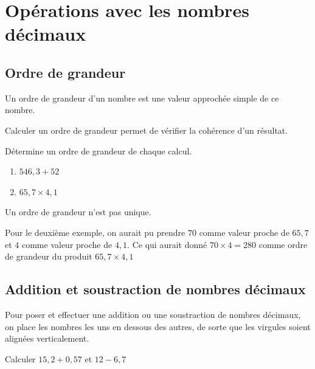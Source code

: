 \documentclass[a4paper,10pt]{report}
\begin{document}
\setcounter{chapter}{9}
\chapter{Opérations avec les nombres décimaux}

\section{Ordre de grandeur}

\begin{defn}
Un ordre de grandeur d’un nombre est une valeur approchée simple de ce nombre.
\end{defn}

\begin{rem}
Calculer un ordre de grandeur permet de vérifier la cohérence d’un résultat.
\end{rem}

\begin{ex}
Détermine un ordre de grandeur de chaque calcul.
\begin{enumerate}
\item $546,3+52$
\item $65,7 \times 4,1$
\end{enumerate}

\noindent\grandscarreaux{\linewidth}{4cm}
\end{ex}

\begin{rem}
Un ordre de grandeur n'est pas unique.

\noindent Pour le deuxième exemple, on aurait pu prendre $70$ comme valeur proche de $65,7$ et $4$ comme valeur proche de $4,1$. Ce qui aurait donné $70 \times 4=280$ comme ordre de grandeur du produit $65,7\times 4,1$
\end{rem}

\section{Addition et soustraction de nombres décimaux}

\begin{prop}
Pour poser et effectuer une addition ou une soustraction de nombres décimaux, on place les nombres les uns en dessous des autres, de sorte que les virgules soient alignées verticalement.
\end{prop}

\begin{ex}
Calculer $15,2 + 0,57$ \quad et \quad $12-6,7$

\noindent\grandscarreaux{\linewidth}{4.8cm}
\end{ex}
\end{document}
